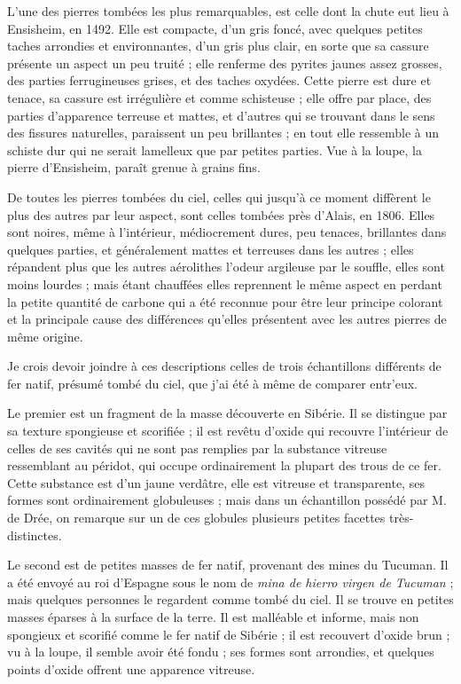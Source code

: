 \documentclass[a4paper, 12pt, oneside, french]{article}
\begin{document}
L'une des pierres tombées les plus remarquables, est celle dont la chute eut lieu à Ensisheim, en 1492. Elle est compacte, d'un gris foncé, avec quelques petites taches arrondies et environnantes, d'un gris plus clair, en sorte que sa cassure présente un aspect un peu truité ; elle renferme des pyrites jaunes assez grosses, des parties ferrugineuses grises, et des taches oxydées. Cette pierre est dure et tenace, sa cassure est irrégulière et comme schisteuse ; elle offre par place, des parties d'apparence terreuse et mattes, et d'autres qui se trouvant dans le sens des fissures naturelles, paraissent un peu brillantes ; en tout elle ressemble à un schiste dur qui ne serait lamelleux que par petites parties. Vue à la loupe, la pierre d'Ensisheim, paraît grenue à grains fins.

De toutes les pierres tombées du ciel, celles qui jusqu'à ce moment diffèrent le plus des autres par leur aspect, sont celles tombées près d'Alais, en 1806. Elles sont noires, même à l'intérieur, médiocrement dures, peu tenaces, brillantes dans quelques parties, et généralement mattes et terreuses dans les autres ; elles répandent plus que les autres aérolithes l'odeur argileuse par le souffle, elles sont moins lourdes ; mais étant chauffées elles reprennent le même aspect en perdant la petite quantité de carbone qui a été reconnue pour être leur principe colorant et la principale cause des différences qu'elles présentent avec les autres pierres de même origine.

Je crois devoir joindre à ces descriptions celles de trois échantillons différents de fer natif, présumé tombé du ciel, que j'ai été à même de comparer entr'eux.

Le premier est un fragment de la masse découverte en Sibérie. Il se distingue par sa texture spongieuse et scorifiée ; il est revêtu d'oxide qui recouvre l'intérieur de celles de ses cavités qui ne sont pas remplies par la substance vitreuse ressemblant au péridot, qui occupe ordinairement la plupart des trous de ce fer. Cette substance est d'un jaune verdâtre, elle est vitreuse et transparente, ses formes sont ordinairement globuleuses ; mais dans un échantillon possédé par M. de Drée, on remarque sur un de ces globules plusieurs petites facettes très-distinctes.

Le second est de petites masses de fer natif, provenant des mines du Tucuman. Il a été envoyé au roi d'Espagne sous le nom de \emph{mina de hierro virgen de Tucuman} ; mais quelques personnes le regardent comme tombé du ciel. Il se trouve en petites masses éparses à la surface de la terre. Il est malléable et informe, mais non spongieux et scorifié comme le fer natif de Sibérie ; il est recouvert d'oxide brun ; vu à la loupe, il semble avoir été fondu ; ses formes sont arrondies, et quelques points d'oxide offrent une apparence vitreuse.
\end{document}
